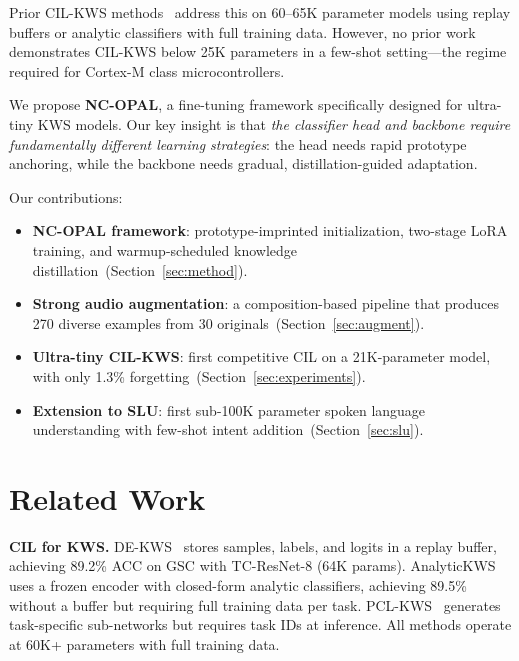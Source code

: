 \documentclass{Interspeech}
\begin{document}
Prior CIL-KWS methods~\cite{peng2024dekws,peng2025analytickws} address this on 60--65K parameter models using replay buffers or analytic classifiers with full training data.
However, no prior work demonstrates CIL-KWS below 25K parameters in a few-shot setting---the regime required for Cortex-M class microcontrollers.

We propose \textbf{NC-OPAL}, a fine-tuning framework specifically designed for ultra-tiny KWS models.
Our key insight is that \emph{the classifier head and backbone require fundamentally different learning strategies}: the head needs rapid prototype anchoring, while the backbone needs gradual, distillation-guided adaptation.

\noindent Our contributions:
\begin{itemize}
\setlength\itemsep{0pt}
\item \textbf{NC-OPAL framework}: prototype-imprinted initialization, two-stage LoRA training, and warmup-scheduled knowledge distillation~(Section~\ref{sec:method}).
\item \textbf{Strong audio augmentation}: a composition-based pipeline that produces 270 diverse examples from 30 originals~(Section~\ref{sec:augment}).
\item \textbf{Ultra-tiny CIL-KWS}: first competitive CIL on a 21K-parameter model, with only 1.3\% forgetting~(Section~\ref{sec:experiments}).
\item \textbf{Extension to SLU}: first sub-100K parameter spoken language understanding with few-shot intent addition~(Section~\ref{sec:slu}).
\end{itemize}

\section{Related Work}
\label{sec:related}

\noindent\textbf{CIL for KWS.}\quad
DE-KWS~\cite{peng2024dekws} stores samples, labels, and logits in a replay buffer, achieving 89.2\% ACC on GSC with TC-ResNet-8 (64K params).
AnalyticKWS~\cite{peng2025analytickws} uses a frozen encoder with closed-form analytic classifiers, achieving 89.5\% without a buffer but requiring full training data per task.
PCL-KWS~\cite{pclkws2022} generates task-specific sub-networks but requires task IDs at inference.
All methods operate at 60K+ parameters with full training data.
\end{document}
